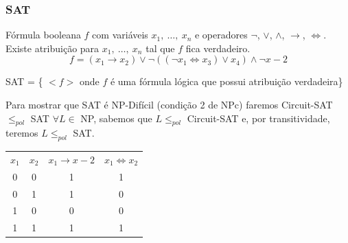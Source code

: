 \documentclass[a4paper,oneside,article,table]{article}
\begin{document}
            \subsubsection{SAT}
            Fórmula booleana $f$ com variáveis $x_1,~\ldots,~x_n$ e operadores $\lnot$, $\lor$, $\land$, $\rightarrow$, $\iff$. 
            Existe atribuição para $x_1,~\ldots,~x_n$ tal que $f$ fica verdadeiro.
            \[f = (x_1 \rightarrow x_2) \lor \lnot ( (\lnot x_1 \iff x_3) \lor x_4) \land  \lnot x-2\]

            SAT = \{ $<f>$ onde $f$ é uma fórmula lógica que possui atribuição verdadeira\}

            Para mostrar que SAT é NP-Difícil (condição 2 de NPc) faremos Circuit-SAT ${\leq}_{pol}$ SAT
            $\forall L \in$ NP, sabemos que $L {\leq}_{pol}$ Circuit-SAT e, por transitividade, teremos $L {\leq}_{pol}$ SAT.

            \begin{table}
                \begin{tabular}{c c c c}
                        $x_1$ & $x_2$ & $x_1 \rightarrow x-2$ & $x_1 \iff x_2$\\
                        0 & 0 & 1 & 1\\
                        0 & 1 & 1 & 0\\
                        1 & 0 & 0 & 0\\
                        1 & 1 & 1 & 1\\
                \end{tabular}
            \end{table}
\end{document}
